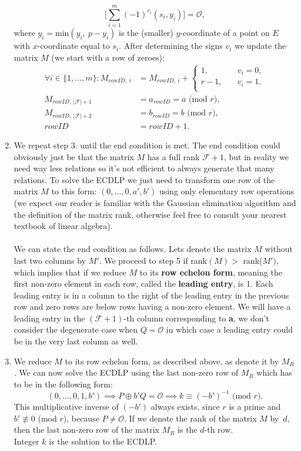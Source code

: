 \documentclass[thesis=M,english]{FITthesis}[2012/10/20]
\theoremstyle{remark}
\theoremstyle{definition}
\begin{document}
\begin{enumerate}
$$
\bigg[\sum_{i=1}^m(-1)^{v_i}(s_i, y_i) \bigg] = \mathcal{O}, 
$$
where $y_i = \text{min}(y_i,\ p - y_i)$ is the (smaller) $y$-coordinate of a point on $E$ with $x$-coordinate equal to $s_i$. After determining the signs $v_i$ we update the matrix $M$ (we start with a row of zeroes):
\begin{align*}
\forall i \in \{1,\ldots,m\}: M_{rowID,\ i} &= M_{rowID,\ i} + \begin{cases} 1, \quad &v_i = 0, \\
r-1, \quad &v_i = 1. \\
\end{cases}\\
M_{rowID,\ |\mathcal{F}| + 1} &= a_{rowID} = a \text{ (mod $r$)}, \\
M_{rowID,\ |\mathcal{F}| + 2} &= b_{rowID} = b \text{ (mod $r$)}, \\
rowID &= rowID + 1.
\end{align*}
\item We repeat step 3. until the end condition is met. The end condition could obviously just be that the matrix $M$ has a full rank $\mathcal{F} + 1$, but in reality we need way less relations so it's not efficient to always generate that many relations. To solve the ECDLP we just need to transform one row of the matrix $M$ to this form: $(0, \ldots, 0,a',b')$ using only elementary row operations (we expect our reader is familiar with the Gaussian elimination algorithm and the definition of the matrix rank, otherwise feel free to consult your nearest textbook of linear algebra). \\ \\
\noindent We can state the end condition as follows. Lets denote the matrix $M$ without last two columns by $M'$. We proceed to step 5 if rank$(M) > $ rank($M')$, which implies that if we reduce $M$ to its \textbf{row echelon form}, meaning the first non-zero element in each row, called the \textbf{leading entry}, is 1. Each leading entry is in a column to the right of the leading entry in the previous row and zero rows are below rows having a non-zero element. We will have a leading entry in the $(\mathcal{F} + 1)$-th column corresponding to \textbf{a}, we don't consider the degenerate case when $Q = \mathcal{O}$ in which case a leading entry could be in the very last column as well.
\item We reduce $M$ to its row echelon form, as described above, as denote it by $M_R$. We can now solve the ECDLP using the last non-zero row of $M_R$ which has to be in the following form:
$$
(0, \ldots, 0, 1, b') \implies P \oplus b'Q = \mathcal{O} \implies k \equiv (-b')^{-1} \text{ (mod $r$)}.
$$
This multiplicative inverse of $(-b')$ always exists, since $r$ is a prime and $b' \not\equiv 0$ (mod $r$), because $P \neq \mathcal{O}$. If we denote the rank of the matrix $M$ by~$d$, then the last non-zero row of the matrix $M_R$ is the $d$-th row. \\ Integer $k$ is the solution to the ECDLP.
\end{enumerate}
\end{document}
